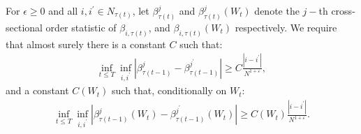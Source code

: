 \begin{assumption}
\label{ass:condbetas}

For $\epsilon \geq 0$ and all $i ,i^\prime \in N_{\tau(t)}$, let $\beta_{\tau(t)}^{j}$ and $\beta _{\tau(t)}^{j}\left( W_t\right)$ denote the $j-$th cross-sectional order statistic of $\beta _{i,\tau(t) }$, and $\beta_{i,\tau(t) }\left( W_t\right)$ respectively. We require that almost surely there is a constant $C$ such that:
\begin{align*}
    \inf_{t\leq T}\inf_{i,i^{\prime }}\left\vert \beta _{\tau(t-1) }^{j}-\beta _{\tau(t-1) }^{j^{\prime }}\right\vert \geq C\frac{\left\vert i-i^{\prime }\right\vert }{N^{1+\varepsilon }},
\end{align*}
and a constant $C(W_t)$ such that, conditionally on $W_t$:
\begin{align*}
    \inf_{t\leq T}\inf_{i,i^{\prime }}\left\vert \beta _{\tau(t-1) }^{j}\left( W_t\right) -\beta_{\tau(t-1) }^{j^{\prime }}\left( W_t\right) \right\vert \geq C\left( W_t\right) \frac{\left\vert i-i^{\prime }\right\vert }{N^{1+\varepsilon }}.
\end{align*}
\end{assumption}


